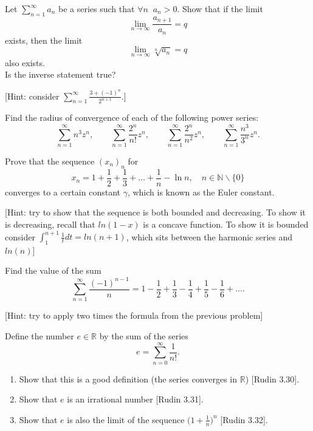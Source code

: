 \documentclass[11pt]{article}%
\begin{document}
\begin{Exercise}[title=**] Let $\sum_{n=1}^{\infty} a_n$ be a series such that $\forall n\;\; a_n>0$. Show that if the limit \begin{equation*}\label{A}\lim\limits_{n\to\infty}\frac{a_{n+1}}{a_n}=q\end{equation*} exists, then the limit \begin{equation*}\label{B}\lim\limits_{n\to\infty}\sqrt[n]{a_n}=q\end{equation*} also exists.\\ Is the inverse statement true?
\bigskip

[Hint: consider $\sum_{n=1}^{\infty}\frac{3+(-1)^n}{2^{n+1}}$.]
\end{Exercise}

\begin{Exercise}[title=**$\dagger$] Find the radius of convergence of each of the following power series: $$\sum_{n=1}^{\infty}n^3z^n,\qquad\sum_{n=1}^{\infty}\frac{2^n}{n!}z^n,\qquad\sum_{n=1}^{\infty}\frac{2^n}{n^2}z^n,\qquad\sum_{n=1}^{\infty}\frac{n^3}{3^n}z^n.$$
\end{Exercise}

\begin{Exercise}[title=**] Prove that the sequence $(x_n)_n$ for
	$$x_n=1+\frac{1}{2}+\frac{1}{3}+\ldots+\frac{1}{n}-\ln n,\quad n\in\mathbb N \backslash \{0\}$$ converges to a certain constant $\gamma$, which is known as the Euler constant.
\bigskip

[Hint: try to show that the sequence is both bounded and decreasing. To show it is decreasing, recall that $ln(1-x)$ is a concave function. To  show it is bounded consider $\int_1^{n+1}\frac{1}{t}dt = ln(n+1)$, which sits between the harmonic series and $ln(n)$]


\end{Exercise}

\begin{Exercise}[title=*] Find the value of the sum $$\sum_{n=1}^{\infty}\frac{(-1)^{n-1}}{n}=1-\frac{1}{2}+\frac{1}{3}-\frac{1}{4}+\frac{1}{5}-\frac{1}{6}+\ldots.$$

[Hint: try to apply two times the formula from the previous problem]
\end{Exercise}


\begin{Exercise}[title={**}] Define the number $e\in \mathbb R$ by the sum of the series
$$
e=\sum_{n=0}^{\infty}\frac{1}{n!}.
$$
\begin{enumerate}
	\item Show that this is a good definition (the series converges in $\mathbb{R}$) [Rudin 3.30].
	\item {Show that $e$ is an irrational number [Rudin 3.31].}
	\item {Show that $e$ is also the limit of the sequence $\Big(1+\frac{1}{n}\Big)^n$ [Rudin 3.32].}
\end{enumerate}

\end{Exercise}
\end{document}
